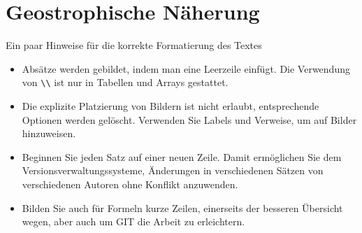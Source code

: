 %
%
%
%
\chapter{Geostrophische Näherung\label{chapter:geostrophisch}}
\begin{refsection}

Ein paar Hinweise für die korrekte Formatierung des Textes 
\begin{itemize}
\item
Absätze werden gebildet, indem man eine Leerzeile einfügt.
Die Verwendung von \verb+\\+ ist nur in Tabellen und Arrays gestattet.
\item
Die explizite Platzierung von Bildern ist nicht erlaubt, entsprechende
Optionen werden gelöscht. 
Verwenden Sie Labels und Verweise, um auf Bilder hinzuweisen.
\item
Beginnen Sie jeden Satz auf einer neuen Zeile. 
Damit ermöglichen Sie dem Versionsverwaltungssysteme, Änderungen
in verschiedenen Sätzen von verschiedenen Autoren ohne Konflikt 
anzuwenden.
\item 
Bilden Sie auch für Formeln kurze Zeilen, einerseits der besseren
Übersicht wegen, aber auch um GIT die Arbeit zu erleichtern.
\end{itemize}






\printbibliography[heading=subbibliography]
\end{refsection}
